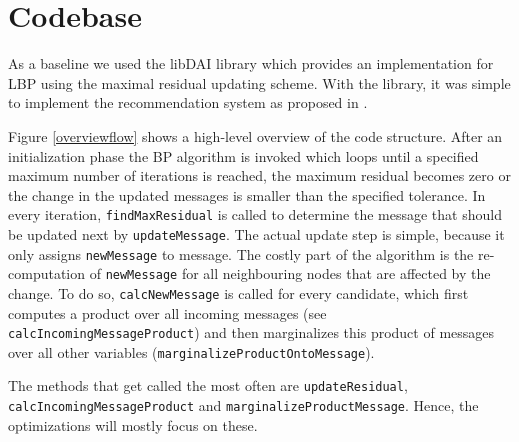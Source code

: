 \section{Codebase}\label{sec:code}
As a baseline we used the libDAI library \cite{Mooij_libDAI_10} which provides an implementation for LBP using the maximal residual updating scheme. With the library, it was simple to implement the recommendation system as proposed in  \cite{Ha:2012:TRT:2396761.2398636}.

Figure \ref{overviewflow} shows a high-level overview of the code structure. After an initialization phase the BP algorithm is invoked which loops until a specified maximum number of iterations is reached, the maximum residual becomes zero or the change in the updated messages is smaller than the specified tolerance. In every iteration, \texttt{findMaxResidual} is called to determine the message that should be updated next by \texttt{updateMessage}. The actual update step is simple, because it only assigns \texttt{new\-Message} to message. The costly part of the algorithm is the re-computation of \texttt{newMessage} for all neighbouring nodes that are affected by the change. To do so, \texttt{calcNew\-Message} is called for every candidate, which first computes a product over all incoming messages (see \texttt{calc\-IncomingMessageProduct}) and then marginalizes this product of messages over all other variables (\texttt{margina\-lizeProductOntoMessage}). 


The methods that get called the most often are \texttt{update\-Residual}, \texttt{calcIncomingMessageProduct} and \linebreak\texttt{marginalizeProductMessage}. Hence, the optimizations will mostly focus on these.

